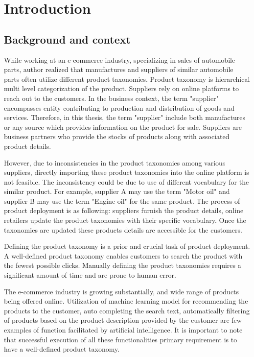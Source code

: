 \chapter{Introduction}

\section{Background and context}

While working at an e-commerce industry, specializing in sales of automobile parts, author realized that manufactures and suppliers of similar automobile parts often utilize different product taxonomies. Product taxonomy is hierarchical multi level categorization of the product.  Suppliers rely on online platforms to reach out to the customers. In the business context, the term "supplier" encompasses entity contributing to production and distribution of goods and services. Therefore, in this thesis, the term "supplier" include both manufactures or any source which provides information on the product for sale. Suppliers are business partners who provide the stocks of products along with associated product details.

However, due to inconsistencies in the product taxonomies among various suppliers, directly importing these product taxonomies into the online platform is not feasible. The inconsistency could be due to use of different vocabulary for the similar product. For example, supplier A may use the term "Motor oil" and supplier B may use the term "Engine oil" for the same product. The process of product deployment is as following: suppliers furnish the product details, online retailers update the product taxonomies with their specific vocabulary. Once the taxonomies are updated these products details are accessible for the customers.

Defining the product taxonomy is a prior and crucial task of product deployment. A well-defined product taxonomy enables customers to search the product with the fewest possible clicks.  Manually defining the product taxonomies requires a significant amount of time and are prone to human error. 

The e-commerce industry is growing substantially, and wide range of products being offered online. Utilization of machine learning model for recommending the products to the customer, auto completing the search text, automatically filtering of products based on the product description provided by the customer are few examples of function facilitated by artificial intelligence. It is important to note that successful execution of all these functionalities primary requirement is to have a well-defined product taxonomy.

